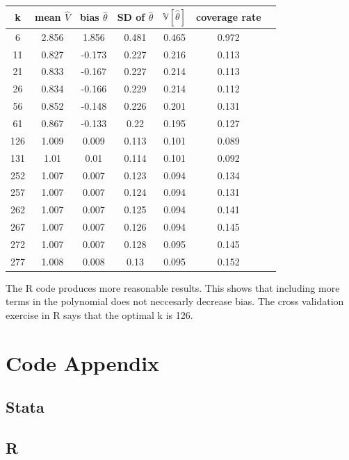 \documentclass[12pt]{article}
\newcommand{\V}{\mathbb{V}}
\begin{document}
\newpage
\begin{tabular}{|c|c|c|c|c|c|c||}
\hline
k     &   mean $\hat{V}$   &  bias $\hat{\theta}$     &   SD of $\hat{\theta}$  &  $\V[\hat{\theta}]$  &   coverage rate  \\
\hline
6 & 2.856 & 1.856 & 0.481 & 0.465 & 0.972\\
11 & 0.827 & -0.173 & 0.227 & 0.216 & 0.113\\
21 & 0.833 & -0.167 & 0.227 & 0.214 & 0.113\\
26 & 0.834 & -0.166 & 0.229 & 0.214 & 0.112\\
56 & 0.852 & -0.148 & 0.226 & 0.201 & 0.131\\
61 & 0.867 & -0.133 & 0.22 & 0.195 & 0.127\\
126 & 1.009 & 0.009 & 0.113 & 0.101 & 0.089\\
131 & 1.01 & 0.01 & 0.114 & 0.101 & 0.092\\
252 & 1.007 & 0.007 & 0.123 & 0.094 & 0.134\\
257 & 1.007 & 0.007 & 0.124 & 0.094 & 0.131\\
262 & 1.007 & 0.007 & 0.125 & 0.094 & 0.141\\
267 & 1.007 & 0.007 & 0.126 & 0.094 & 0.145\\
272 & 1.007 & 0.007 & 0.128 & 0.095 & 0.145\\
277 & 1.008 & 0.008 & 0.13 & 0.095 & 0.152\\
\hline
\hline
\end{tabular}

\vspace{1cm}
The R code produces more reasonable results. This shows that including more terms in the polynomial does not neccesarly decrease bias. The cross validation exercise in R says that the optimal k is 126.

\newpage
\section{Code Appendix}
\tiny
\subsection*{Stata}

\subsection*{R}



\end{document}
